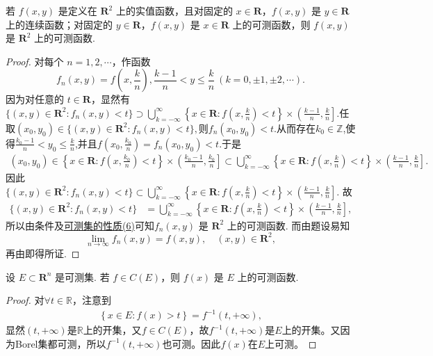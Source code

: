 \documentclass[../../main.tex]{subfiles}
\begin{document}
\begin{proposition}
若 \(f(x,y)\) 是定义在 \(\mathbf{R}^2\) 上的实值函数，且对固定的 \(x \in \mathbf{R}\)，\(f(x,y)\) 是 \(y \in \mathbf{R}\) 上的连续函数；对固定的 \(y \in \mathbf{R}\)，\(f(x,y)\) 是 \(x \in \mathbf{R}\) 上的可测函数，则 \(f(x,y)\) 是 \(\mathbf{R}^2\) 上的可测函数.
\end{proposition}
\begin{proof}
对每个 \(n = 1,2,\cdots\)，作函数
\[
f_n(x,y) = f\left(x,\frac{k}{n}\right), \frac{k - 1}{n} < y \leqslant \frac{k}{n} \ (k = 0, \pm 1, \pm 2,\cdots).
\]
因为对任意的 \(t \in \mathbf{R}\)，显然有$\{(x,y) \in \mathbf{R}^2: f_n(x,y) < t\} 
\supset \bigcup_{k = -\infty}^{\infty}\left\{x \in \mathbf{R}: f\left(x,\frac{k}{n}\right) < t\right\} \times \left(\frac{k - 1}{n}, \frac{k}{n}\right].$任取$(x_0,y_0)\in \{(x,y) \in \mathbf{R}^2: f_n(x,y) < t\},$则$f_n(x_0,y_0)<t$.从而存在$k_0\in \mathbb{Z}$,使得$\frac{k_0-1}{n}<y_0 \leq \frac{k}{n}$,并且$f(x_0,\frac{k_0}{n})=f_n(x_0,y_0)<t$.于是
\begin{align*}
(x_0,y_0)\in\left\{x \in \mathbf{R}: f\left(x,\frac{k_0}{n}\right) < t\right\} \times \left(\frac{k_0 - 1}{n}, \frac{k_0}{n}\right] \subset \bigcup_{k = -\infty}^{\infty}\left\{x \in \mathbf{R}: f\left(x,\frac{k}{n}\right) < t\right\} \times \left(\frac{k - 1}{n}, \frac{k}{n}\right].
\end{align*}
因此$\{(x,y) \in \mathbf{R}^2: f_n(x,y) < t\} 
\subset \bigcup_{k = -\infty}^{\infty}\left\{x \in \mathbf{R}: f\left(x,\frac{k}{n}\right) < t\right\} \times \left(\frac{k - 1}{n}, \frac{k}{n}\right].$
故
\begin{align*}
\{(x,y) \in \mathbf{R}^2: f_n(x,y) < t\} 
&= \bigcup_{k = -\infty}^{\infty}\left\{x \in \mathbf{R}: f\left(x,\frac{k}{n}\right) < t\right\} \times \left(\frac{k - 1}{n}, \frac{k}{n}\right],
\end{align*}
所以由条件及\hyperref[theorem:可测集的性质]{可测集的性质(6)}可知\(f_n(x,y)\) 是 \(\mathbf{R}^2\) 上的可测函数. 而由题设易知
\[
\lim_{n \to \infty}f_n(x,y) = f(x,y), \quad (x,y) \in \mathbf{R}^2,
\]
再由即得所证.
\end{proof}

\begin{proposition}[连续函数必可测]\label{proposition:连续函数必可测}
设 \(E \subset \mathbf{R}^n\) 是可测集. 若 \(f \in C(E)\)，则 \(f(x)\) 是 \(E\) 上的可测函数. 
\end{proposition}
\begin{proof}
对$\forall t\in \mathbb{R}$，注意到
\begin{align*}
\left\{ x\in E:f\left( x \right) >t \right\} =f^{-1}\left( t,+\infty \right) ,
\end{align*}
显然$\left( t,+\infty \right)$是$\mathbb{R}$上的开集，又$f\in C\left( E \right)$，故$f^{-1}\left( t,+\infty \right)$是$E$上的开集。又因为Borel集都可测，所以$f^{-1}\left( t,+\infty \right)$也可测。因此$f\left( x \right)$在$E$上可测。
\end{proof}
\end{document}
